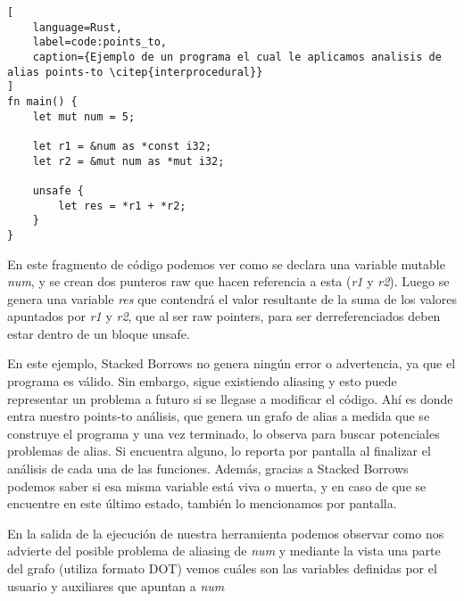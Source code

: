 \begin{lstlisting}[
    language=Rust,
    label=code:points_to,
    caption={Ejemplo de un programa el cual le aplicamos analisis de alias points-to \citep{interprocedural}}
]
fn main() {
    let mut num = 5;

    let r1 = &num as *const i32;
    let r2 = &mut num as *mut i32;

    unsafe {
        let res = *r1 + *r2;
    }
}
\end{lstlisting}

En este fragmento de código podemos ver como se declara una variable mutable \textit{num}, y se crean dos punteros raw que hacen referencia a esta (\textit{r1} y \textit{r2}). Luego se genera una variable \textit{res} que contendrá el valor resultante de la suma de los valores apuntados por \textit{r1} y \textit{r2}, que al ser raw pointers, para ser derreferenciados deben estar dentro de un bloque unsafe.

En este ejemplo, Stacked Borrows no genera ningún error o advertencia, ya que el programa es válido. Sin embargo, sigue existiendo aliasing y esto puede representar un problema a futuro si se llegase a modificar el código. Ahí es donde entra nuestro points-to análisis, que genera un grafo de alias a medida que se construye el programa y una vez terminado, lo observa para buscar potenciales problemas de alias. Si encuentra alguno, lo reporta por pantalla al finalizar el análisis de cada una de las funciones. Además, gracias a Stacked Borrows podemos saber si esa misma variable está viva o muerta, y en caso de que se encuentre en este último estado, también lo mencionamos por pantalla.

En la salida de la ejecución de nuestra herramienta podemos observar como nos advierte del posible problema de aliasing de \textit{num} y mediante la vista una parte del grafo (utiliza formato DOT) vemos cuáles son las variables definidas por el usuario y auxiliares que apuntan a \textit{num}

